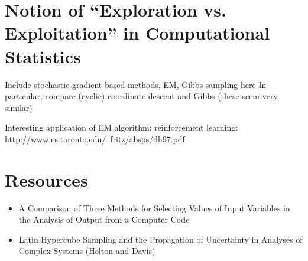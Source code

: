 \documentclass[12pt]{article}
\begin{document}
\section{Notion of ``Exploration vs. Exploitation'' in Computational Statistics}
Include stochastic gradient based methods, EM, Gibbs sampling here 
In particular, compare (cyclic) coordinate descent and Gibbs (these seem very similar) 

Interesting application of EM algorithm: reinforcement learning: 
http://www.cs.toronto.edu/~fritz/absps/dh97.pdf

\section{Resources}
\begin{itemize}
\item A Comparison of Three Methods for Selecting Values of Input Variables in the Analysis of Output from a Computer Code 
\item Latin Hypercube Sampling and the Propagation of Uncertainty in Analyses of Complex Systems (Helton and Davis)
\end{itemize}
\end{document}
